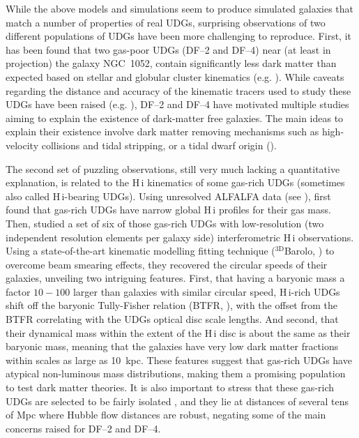\documentclass[fleqn,usenatbib]{mnras}
\begin{document}
While the above models and simulations seem to produce simulated galaxies that match a number of properties of real UDGs, surprising observations of two different populations of UDGs have been more challenging to reproduce. First, it has been found that two gas-poor UDGs (DF--2 and DF--4) near (at least in projection) the galaxy NGC~1052, contain significantly less dark matter than expected based on stellar and globular cluster kinematics (e.g. \citealt{vandokkum_DF2,vandokkum_DF4,danieli_DF2,emsellem_DF2}). While caveats regarding the distance and accuracy of the kinematic tracers used to study these UDGs have been raised (e.g. \citealt{laporte_udgs,trujillo_distanceDF2}), DF--2 and DF--4 have motivated multiple studies aiming to explain the existence of dark-matter free galaxies. The main ideas to explain their existence involve dark matter removing mechanisms such as high-velocity collisions and tidal stripping, or a tidal dwarf origin (\citealt{haslbauer_UDGsnoDMIllustris,silk_udgs, montes_df4,shin_udgs,doppel_udgs,jackson_tidalUDGs}).

The second set of puzzling observations, still very much lacking a quantitative explanation, is related to the H\,{\sc i} kinematics of some gas-rich UDGs (sometimes also called H\,{\sc i}-bearing UDGs). Using unresolved ALFALFA data (see \citealt{alfalfa}), \citet[][see also \citealt{jones_huds,karunakaran2020}]{leisman2017} first found that gas-rich UDGs have narrow global H\,{\sc i} profiles for their gas mass. Then, \citet{huds2019,huds2020} studied a set of six of those gas-rich UDGs with low-resolution (two independent resolution elements per galaxy side) interferometric H\,{\sc i} observations. Using a state-of-the-art kinematic modelling fitting technique ($\mathrm{^{3D}}$Barolo, \citealt{barolo}) to overcome beam smearing effects, they recovered the circular speeds of their galaxies, unveiling two intriguing features. First, that having a baryonic mass a factor $10-100$ larger than galaxies with similar circular speed, H\,{\sc i}-rich UDGs shift off the baryonic Tully-Fisher relation (BTFR, \citealt{mcgaugh2000}), with the offset from the BTFR correlating with the UDGs optical disc scale lengths. And second, that their dynamical mass within the extent of the H\,{\sc i} disc is about the same as their baryonic mass, meaning that the galaxies have very low dark matter fractions within scales as large as 10~kpc. These features suggest that gas-rich UDGs have atypical non-luminous mass distributions, making them a promising population to test dark matter theories. It is also important to stress that these gas-rich UDGs are selected to be fairly isolated \citep{leisman2017}, and they lie at distances of several tens of Mpc where Hubble flow distances are robust, negating some of the main concerns raised for DF--2 and DF--4.
\end{document}

